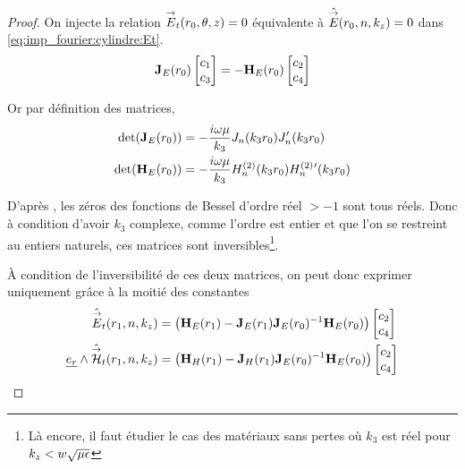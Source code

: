         \begin{proof}

            On injecte la relation ${\overset{\rightarrow}{E}}_t(r_0,\theta,z) = 0$ équivalente à $\hat {{\overset{\rightarrow}{E}}}(r_0,n,k_z) = 0$ dans \eqref{eq:imp_fourier:cylindre:Et}.
            \begin{equation}
                \mathbf{J}_{E}(r_0)
                \begin{bmatrix}
                    c_1 \\
                    c_3
                \end{bmatrix}
                =-\mathbf{H}_{E}(r_0)
                \begin{bmatrix}
                    c_2 \\
                    c_4
                \end{bmatrix}
            \end{equation}

            Or par définition des matrices,
            \begin{align}
                \det(\mathbf{J}_E(r_0)) &= -\dfrac{i\omega\mu}{k_3}J_n(k_3r_0)J_n'(k_3r_0)
                \\
                \det(\mathbf{H}_E(r_0)) &= -\dfrac{i\omega\mu}{k_3}H_n^{(2)}(k_3r_0)H_n^{(2)}{}'(k_3r_0)
            \end{align}

            D’après \cite[p.~370]{abramowitz_handbook_1964}, les zéros des fonctions de Bessel d'ordre réel $>-1$ sont tous réels. Donc à condition d'avoir $k_3$ complexe, comme l'ordre est entier et que l'on se restreint au entiers naturels, ces matrices sont inversibles\footnote{Là encore, il faut étudier le cas des matériaux sans pertes où $k_3$ est réel pour $k_z < w\sqrt{\mu\epsilon}$}.
            
            À condition de l'inversibilité de ces deux matrices, on peut donc exprimer uniquement grâce à la moitié des constantes
            \begin{align}
                \hat {{\overset{\rightarrow}{E}}}_t(r_1,n,k_z) &= 
                \left(\mathbf{H}_{E}(r_1) - \mathbf{J}_{E}(r_1)\mathbf{J}_{E}(r_0)^{-1}\mathbf{H}_{E}(r_0)\right)
                \begin{bmatrix}
                    c_2 \\
                    c_4
                \end{bmatrix}
                \\
                \underline{e_r}\wedge \hat {{\overset{\rightarrow}{\mathcal{H}}}}_t(r_1,n,k_z) &= 
                \left(\mathbf{H}_{H}(r_1) - \mathbf{J}_{H}(r_1)\mathbf{J}_{E}(r_0)^{-1}\mathbf{H}_{E}(r_0) \right)
                \begin{bmatrix}
                    c_2 \\
                    c_4
                \end{bmatrix}
            \end{align}


\end{proof}
